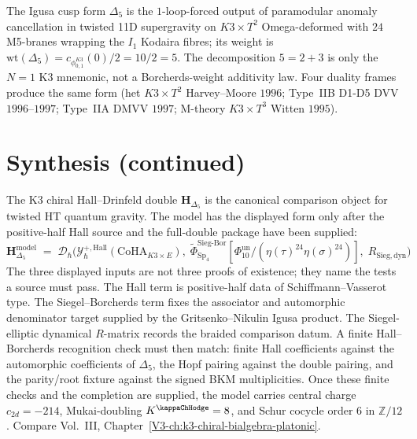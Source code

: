 \begin{remark}
\label{rem:ex-delta5-1loop}
The Igusa cusp form $\Delta_5$ is the $1$-loop-forced output of paramodular anomaly
cancellation in twisted 11D supergravity on $K3 \times T^2$ Omega-deformed with $24$
M5-branes wrapping the $I_1$ Kodaira fibres; its weight is
$\mathrm{wt}(\Delta_5)=c_{\phi_{0,1}^{K3}}(0)/2=10/2=5$.
The decomposition $5=2+3$ is only the $N=1$ K3 mnemonic, not a
Borcherds-weight additivity law. Four duality frames produce the same form
(het $K3 \times T^2$ Harvey--Moore $1996$; Type~IIB D1-D5 DVV $1996$--$1997$; Type~IIA
DMVV $1997$; M-theory $K3 \times T^3$ Witten $1995$).
\end{remark}

\section{Synthesis (continued)}
\label{sec:ew-deep}

\begin{remark}
\label{rem:ew-deep-1}
The K3 chiral Hall--Drinfeld double
$\mathbf H_{\Delta_5}$ is the canonical comparison object for twisted
HT quantum gravity.  The model has the displayed form only after the
positive-half Hall source and the full-double package have been
supplied:
\[
\mathbf H_{\Delta_5}^{\mathrm{model}} \;=\; \mathcal D_\hbar\!\bigl(\mathcal Y^{+,\mathrm{Hall}}_\hbar(\mathrm{CoHA}_{K3\times E}),\;
\widetilde\Phi^{\mathrm{Sieg\text{-}Bor}}_{\mathrm{Sp}_4}
[\Phi_{10}^{\mathrm{un}}/(\eta(\tau)^{24}\eta(\sigma)^{24})],\;
R_{\mathrm{Sieg,dyn}}\bigr)
\]
The three displayed inputs are not three proofs of existence; they name
the tests a source must pass.  The Hall term is positive-half data of
Schiffmann--Vasserot type.  The Siegel--Borcherds term fixes the
associator and automorphic denominator target supplied by the
Gritsenko--Nikulin Igusa product.  The Siegel-elliptic dynamical
$R$-matrix records the braided comparison datum.  A finite
Hall--Borcherds recognition check must then match: finite Hall
coefficients against the automorphic coefficients of $\Delta_5$, the
Hopf pairing against the double pairing, and the parity/root fixture
against the signed BKM multiplicities.  Once these finite checks and
the completion are supplied, the model carries central charge
$c_{2d}=-214$, Mukai-doubling
$K^{\kappaChHodge}=8$, and Schur cocycle order $6$ in
$\mathbb Z/12$. Compare Vol.~III,
Chapter~\ref{V3-ch:k3-chiral-bialgebra-platonic}.
\end{remark}

